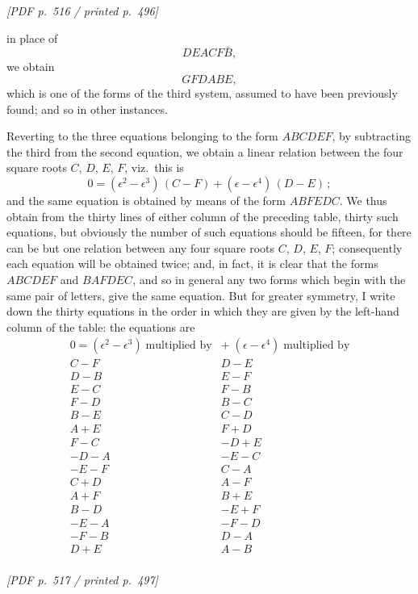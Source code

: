 \documentclass[11pt]{article}
\begin{document}
\vfill
\noindent\textit{[PDF p.~516 / printed p.~496]}
\newpage

\noindent in place of
\[
DEACF\bar{B},
\]
we obtain
\[
GFDABE,
\]
which is one of the forms of the third system, assumed to have been previously found; and so in other instances.

Reverting to the three equations belonging to the form $ABCDEF$, by subtracting the third from the second equation, we obtain a linear relation between the four square roots $C$, $D$, $E$, $F$, viz.\ this is
\[
0 = (\epsilon^{2} - \epsilon^{3})\,(C - F) + (\epsilon - \epsilon^{4})\,(D - E)\,;
\]
and the same equation is obtained by means of the form $ABFEDC$. We thus obtain from the thirty lines of either column of the preceding table, thirty such equations, but obviously the number of such equations should be fifteen, for there can be but one relation between any four square roots $C$, $D$, $E$, $F$; consequently each equation will be obtained twice; and, in fact, it is clear that the forms $ABCDEF$ and $BAFDEC$, and so in general any two forms which begin with the same pair of letters, give the same equation. But for greater symmetry, I write down the thirty equations in the order in which they are given by the left-hand column of the table: the equations are
\[
\begin{array}{c|c}
0 = (\epsilon^{2} - \epsilon^{3})\;\text{multiplied by} & +\;(\epsilon - \epsilon^{4})\;\text{multiplied by} \\
\hline
C - F & D - E \\
D - B & E - F \\
E - C & F - B \\
F - D & B - C \\
B - E & C - D \\
\hline
A + E & F + D \\
F - C & -D + E \\
-D - A & -E - C \\
-E - F & C - A \\
C + D & A - F \\
\hline
A + F & B + E \\
B - D & -E + F \\
-E - A & -F - D \\
-F - B & D - A \\
D + E & A - B \\
\end{array}
\]

\vfill
\noindent\textit{[PDF p.~517 / printed p.~497]}
\newpage
\end{document}

